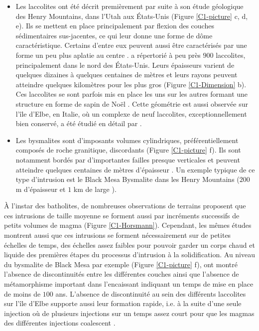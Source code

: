 \begin{itemize}
\item    Les   laccolites    ont   été    décrit   premièrement    par
  \citet{Gilbert:1877uk}  suite  à  son  étude  géologique  des  Henry
  Mountains, dans l'Utah aux États-Unis (Figure \ref{C1-picture} c, d,
  e).  Ils se mettent en  place principalement par flexion des couches
  sédimentaires  sus-jacentes, ce  qui leur  donne une  forme de  dôme
  caractéristique.    Certains   d'entre   eux  peuvent   aussi   être
  caractérisés  par   une  forme  un   peu  plus  aplatie   au  centre
  \citep{Koch:1981if}. \citet{E:2015tl} a répertorié  à peu près $900$
  laccolites,  principalement  dans  le nord  des  États-Unis.   Leurs
  épaisseurs  varient de  quelques  dizaines à  quelques centaines  de
  mètres et  leurs rayons  peuvent atteindre quelques  kilomètres pour
  les plus gros (Figure \ref{C1-Dimension} b).  Ces laccolites se sont
  parfois mis en place les uns sur les autres formant une structure en
  forme de sapin de Noël  \citep{E:2015tl}.  Cette géométrie est aussi
  observée  sur  l'île d'Elbe,  en  Italie,  où  un complexe  de  neuf
  laccolites, exceptionnellement bien conservé, a été étudié en détail
  par \citet{Rocchi:2002jy}.

\item   Les   bysmalites   sont  d'imposants   volumes   cylindriques,
  préférentiellement composés de roche granitique, discordants (Figure
  \ref{C1-picture} f).   Ils sont  notamment bordés  par d'importantes
  failles presque  verticales et peuvent atteindre  quelques centaines
  de mètres d'épaisseur \citep{Johnson:1973ho}.  Un exemple typique de
  ce  type d'intrusion  est le  Black  Mesa Bysmalite  dans les  Henry
  Mountains   ($200$    m   d'épaisseur    et   $1$   km    de   large
  \citep{Morgan:2008hj}).
\end{itemize}

À  l'instar des  batholites,  de nombreuses  observations de  terrains
proposent que  ces intrusions de  taille moyenne se forment  aussi par
incréments     successifs    de     petits     volumes    de     magma
\citep{Habert:2004wg,Horsman:2005ct,Morgan:2008hj}             (Figure
\ref{C1-Horsmann}).  Cependant,  les mêmes  études montrent  aussi que
ces intrusions  se forment nécessairement  sur de petites  échelles de
temps, des échelles  assez faibles pour pouvoir garder  un corps chaud
et  liquide  des  premières  étapes  du  processus  d'intrusion  à  la
solidification.   Au niveau  du bysmalite  de Black  Mesa par  exemple
(Figure   \ref{C1-picture}   f),  \citet{Habert:2004wg}   ont   montré
l'absence de  discontinuités entre  les différentes couches  ainsi que
l'absence de  métamorphisme important  dans l'encaissant  indiquant un
temps  de  mise  en  place  de  moins  de  $100$  ans.   L'absence  de
discontinuité  au  sein des  différents  laccolites  sur l'île  d'Elbe
supporte aussi  leur formation  rapide, i.e.  à  la suite  d'une seule
injection où de plusieurs injections sur un temps assez court pour que
les magmas des différentes injections coalescent \citep{Roni:2014gt}.

